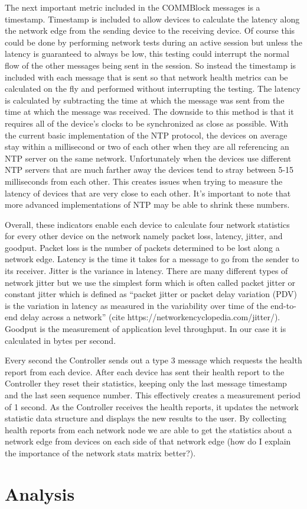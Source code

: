 \documentclass[letterpaper,twocolumn,12pt]{article}
\begin{document}
The next important metric included in the COMMBlock messages is a timestamp. Timestamp is included to allow devices to calculate the latency along the network edge from the sending device to the receiving device. Of course this could be done by performing network tests during an active session but unless the latency is guaranteed to always be low, this testing could interrupt the normal flow of the other messages being sent in the session. So instead the timestamp is included with each message that is sent so that network health metrics can be calculated on the fly and performed without interrupting the testing. The latency is calculated by subtracting the time at which the message was sent from the time at which the message was received. The downside to this method is that it requires all of the device's clocks to be synchronized as close as possible. With the current basic implementation of the NTP protocol, the devices on average stay within a millisecond or two of each other when they are all referencing an NTP server on the same network. Unfortunately when the devices use different NTP servers that are much farther away the devices tend to stray between 5-15 milliseconds from each other. This creates issues when trying to measure the latency of devices that are very close to each other. It's important to note that more advanced implementations of NTP may be able to shrink these numbers.

Overall, these indicators enable each device to calculate four network statistics for every other device on the network namely packet loss, latency, jitter, and goodput. Packet loss is the number of packets determined to be lost along a network edge. Latency is the time it takes for a message to go from the sender to its receiver. Jitter is the variance in latency. There are many different types of network jitter but we use the simplest form which is often called packet jitter or constant jitter which is defined as “packet jitter or packet delay variation (PDV) is the variation in latency as measured in the variability over time of the end-to-end delay across a network” (cite https://networkencyclopedia.com/jitter/). Goodput is the measurement of application level throughput. In our case it is calculated in bytes per second.

Every second the Controller sends out a type 3 message which requests the health report from each device. After each device has sent their health report to the Controller they reset their statistics, keeping only the last message timestamp and the last seen sequence number. This effectively creates a measurement period of 1 second. As the Controller receives the health reports, it updates the network statistic data structure and displays the new results to the user. By collecting health reports from each network node we are able to get the statistics about a network edge from devices on each side of that network edge (how do I explain the importance of the network stats matrix better?).


\section{Analysis}





\end{document}
